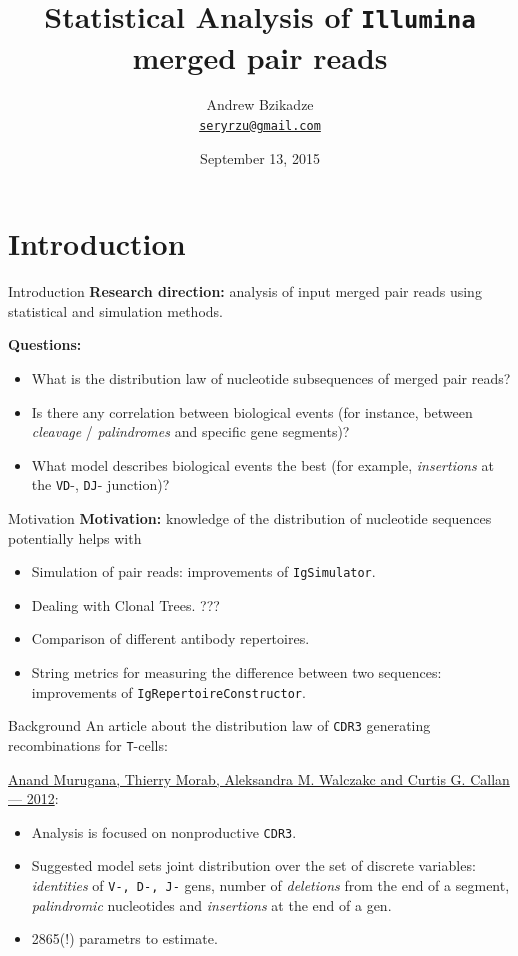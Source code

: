 \documentclass{beamer}\usepackage[]{graphicx}\usepackage[]{color}
\title{Statistical Analysis of \texttt{Illumina} merged pair reads}
\author [Andrew Bzikadze]{Andrew Bzikadze\\ \texttt{\small{\href{mailto:seryrzu@gmail.com}{seryrzu@gmail.com}}}}
\date {
September 13, 2015
}
\begin{document}
\begin{frame}
  \titlepage
\end{frame}

\section{Introduction}
\begin{frame}{Introduction}
  \textbf{Research direction:} analysis of input merged pair reads using statistical and simulation methods.
  
  \pause 
  \textbf{Questions:}
  \begin{itemize}
    \item What is the distribution law of nucleotide subsequences of merged pair reads?
    \item Is there any correlation between biological events (for instance, between \textit{cleavage} / \textit{palindromes} and specific gene segments)?
    \item What model describes biological events the best (for example, \textit{insertions} at the \texttt{VD}-, \texttt{DJ}- junction)? 
  \end{itemize}
\end{frame}

\begin{frame}{Motivation}
  \textbf{Motivation:} knowledge of the distribution of nucleotide sequences potentially helps with
  \begin{itemize}
    \item Simulation of pair reads: improvements of \texttt{IgSimulator}.
    \item Dealing with Clonal Trees. ???
    \item Comparison of different antibody repertoires.
    \item String metrics for measuring the difference between two sequences: improvements of \texttt{IgRepertoireConstructor}.
  \end{itemize}
\end{frame}

\begin{frame}{Background}
  An article about the distribution law of \texttt{CDR3} generating recombinations for \texttt{T}-cells:
  
  \href{http://www.pnas.org/content/109/40/16161.full}{%
  Anand Murugana, Thierry Morab, Aleksandra M. Walczakc and Curtis G. Callan --- 2012}:
  \begin{itemize}
    \item Analysis is focused on nonproductive \texttt{CDR3}.
    \item Suggested model sets joint distribution over the set of discrete variables: \textit{identities} of \texttt{V-, D-, J-} gens, number of \textit{deletions} from the end of a segment, \textit{palindromic} nucleotides and \textit{insertions} at the end of a gen.
    \pause
  \item {\color{blue} 2865(!) parametrs to estimate.}
  \end{itemize}
\end{frame}
\end{document}
